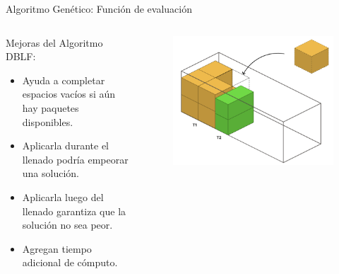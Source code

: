 \documentclass{beamer}
\begin{document}
\begin{frame}{Algoritmo Genético: Función de evaluación}
    \begin{columns}
        \begin{column}{0.6\textwidth}
            \begin{exampleblock}{Mejoras del Algoritmo DBLF:}
                \begin{itemize}[<+-| alert@+>]
                    \item Ayuda a completar espacios vacíos si aún hay paquetes disponibles.
                    \item Aplicarla durante el llenado podría empeorar una solución.
                    \item Aplicarla luego del llenado garantiza que la solución no sea peor.
                    \item Agregan tiempo adicional de cómputo.
                \end{itemize}
            \end{exampleblock}
        \end{column}
        \begin{column}{0.4\textwidth}
            \begin{figure}
                \centering
                \includegraphics[width=1\textwidth]{pic/dblf-mejora.png}
                \label{fig:dblf-mejora}
            \end{figure}
        \end{column}
    \end{columns}
\end{frame}
\end{document}
